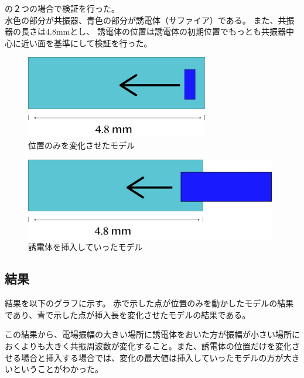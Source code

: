 の２つの場合で検証を行った。\\
水色の部分が共振器、青色の部分が誘電体（サファイア）である。
また、共振器の長さは4.8mmとし、
誘電体の位置は誘電体の初期位置でもっとも共振器中心に近い面を基準にして検証を行った。

\vspace{10 mm}

\begin{figure}[h]
  \begin{center}
    \includegraphics[width=8cm]{./image/pos.png}
    \caption{位置のみを変化させたモデル}
    \label{fig:potition}
  \end{center}
\end{figure}

\vspace{10 mm}

\begin{figure}[h]
  \begin{center}
    \includegraphics[width=11cm]{./image/length.png}
    \caption{誘電体を挿入していったモデル}
    \label{fig:length}
  \end{center}
\end{figure}

\subsection{結果}
結果を以下のグラフに示す。
赤で示した点が位置のみを動かしたモデルの結果であり、青で示した点が挿入長を変化させたモデルの結果である。

この結果から、電場振幅の大きい場所に誘電体をおいた方が振幅が小さい場所におくよりも大きく共振周波数が変化すること。また、誘電体の位置だけを変化させる場合と挿入する場合では、変化の最大値は挿入していったモデルの方が大きいということがわかった。

